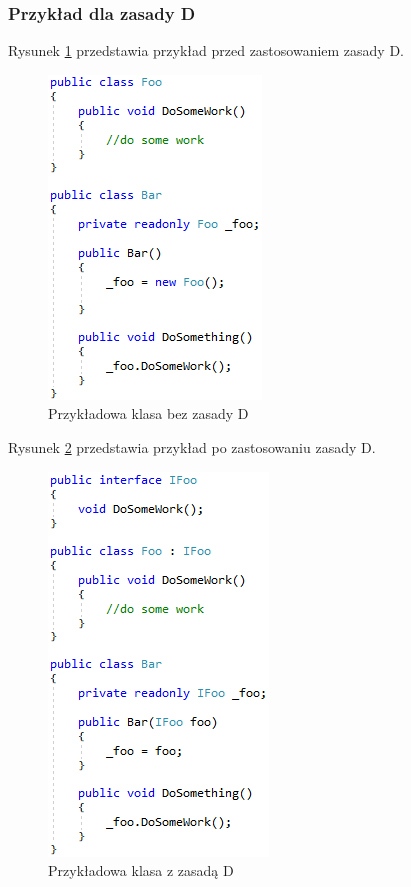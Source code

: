 \documentclass[12pt]{article}
\begin{document}
\subsubsection{Przykład dla zasady D}
Rysunek \ref{fig:Solid_without} przedstawia przykład przed zastosowaniem zasady D.\\
\begin{figure}[H]
	\begin{center}
  		\includegraphics{Solid_without.png}
  		\caption{Przykładowa klasa bez zasady D}
  		\label{fig:Solid_without}
	\end{center}
\end{figure}
Rysunek \ref{fig:Solid_with} przedstawia przykład po zastosowaniu zasady D.\\
\begin{figure}[H]
	\begin{center}
  		\includegraphics{Solid_with.png}
  		\caption{Przykładowa klasa z zasadą D}
  		\label{fig:Solid_with}
	\end{center}
\end{figure}
\end{document}
